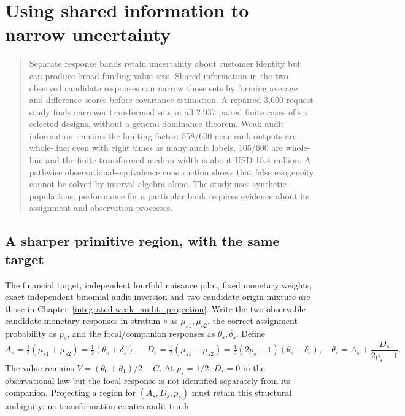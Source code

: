 \chapter{Using shared information to narrow uncertainty}
\label{integrated:weak_audit_sharpening}

\begin{quote}\small
Separate response bands retain uncertainty about customer identity but can
produce broad funding-value sets. Shared information in the two observed
candidate responses can narrow those sets by forming average and difference
scores before covariance estimation. A repaired 3,600-request study finds narrower transformed sets in
all 2,937 paired finite cases of six selected designs, without a general
dominance theorem. Weak audit information remains the limiting factor: 558/600
near-rank outputs are whole-line; even with eight times as many audit labels,
105/600 are whole-line and the finite transformed median width is about
USD 15.4 million. A pathwise observational-equivalence construction shows that
false exogeneity cannot be solved by interval algebra alone. The study uses synthetic populations; performance for a particular bank
requires evidence about its assignment and observation processes.
\end{quote}

\section{A sharper primitive region, with the same target}

The financial target, independent fourfold nuisance pilot, fixed monetary
weights, exact independent-binomial audit inversion and two-candidate origin
mixture are those in Chapter~\ref{integrated:weak_audit_projection}. Write the two observable
candidate monetary responses in stratum $s$ as $\mu_{s1},\mu_{s2}$, the
correct-assignment probability as $p_s$, and the focal/companion responses as
$\theta_s,\delta_s$. Define
\begin{equation}\label{integrated:weak_audit_sharpening:eq:transform}
 A_s=\tfrac12(\mu_{s1}+\mu_{s2})=\tfrac12(\theta_s+\delta_s),\quad
 D_s=\tfrac12(\mu_{s1}-\mu_{s2})=
     \tfrac12(2p_s-1)(\theta_s-\delta_s),\quad
 \theta_s=A_s+\frac{D_s}{2p_s-1}.
\end{equation}
The value remains $V=(\theta_0+\theta_1)/2-C$. At $p_s=1/2$, $D_s=0$ in
the observational law but the focal response is not identified separately
from its companion. Projecting a region for $(A_s,D_s,p_s)$ must retain this
structural ambiguity; no transformation creates audit truth.

